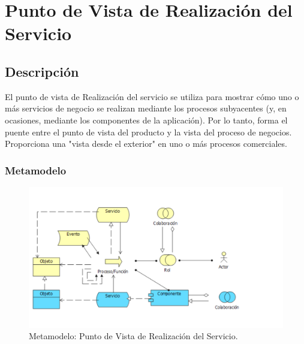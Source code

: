 \section{Punto de Vista de Realización del Servicio}
\subsection{Descripción}
El punto de vista de Realización del servicio se utiliza para mostrar cómo uno o más servicios de negocio se realizan mediante los procesos subyacentes (y, en ocasiones, mediante los componentes de la aplicación). Por lo tanto, forma el puente entre el punto de vista del producto y la vista del proceso de negocios. Proporciona una "vista desde el exterior" en uno o más procesos comerciales.

\subsubsection{Metamodelo}
\begin{figure}[h]
	\centering
	\includegraphics[width=1.0\textwidth]{imagenes/Metamodelos/Tecnologia/meta_realizacion_servicio.PDF}
	\caption{Metamodelo: Punto de Vista de Realización del Servicio.}
	\label{fig:gap_analysis}
\end{figure}

